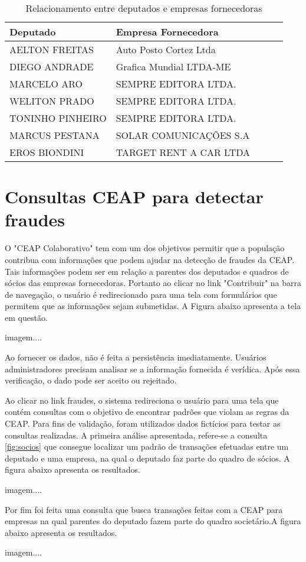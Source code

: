 \begin{table}[h!]
\centering
\begin{tabular}{|l|l|l|l|l|}
\hline
Deputado & Empresa Fornecedora \\ \hline
AELTON FREITAS & Auto Posto Cortez Ltda \\ \hline
DIEGO ANDRADE & Grafica Mundial LTDA-ME \\ \hline
MARCELO ARO & SEMPRE EDITORA LTDA. \\ \hline
WELITON PRADO & SEMPRE EDITORA LTDA. \\ \hline
TONINHO PINHEIRO & SEMPRE EDITORA LTDA. \\ \hline
MARCUS PESTANA & SOLAR COMUNICAÇÕES S.A \\ \hline
EROS BIONDINI & TARGET RENT A CAR LTDA \\ \hline
\end{tabular}
\caption{Relacionamento entre deputados e empresas fornecedoras}
\label{table:relation_deputies_companies}
\end{table}

\section{Consultas CEAP para detectar fraudes}

O "CEAP Colaborativo" tem com um dos objetivos permitir que a população contribua com informações que podem ajudar na detecção de fraudes da CEAP. Tais informações podem ser em relação a parentes dos deputados e quadros de sócios das empresas fornecedoras. Portanto ao clicar no link "Contribuir" na barra de navegação, o usuário é redirecionado para uma tela com formulários que permitem que as informações sejam submetidas. A Figura abaixo apresenta a tela em questão.

imagem....

Ao fornecer os dados, não é feita a persistência imediatamente. Usuários administradores precisam analisar se a informação fornecida é verídica. Após essa verificação, o dado pode ser aceito ou rejeitado.

Ao clicar no link fraudes, o sistema redireciona o usuário para uma tela que contém consultas com o objetivo de encontrar padrões que violam as regras da CEAP. Para fins de validação, foram utilizados dados fictícios para testar as consultas realizadas. A primeira análise apresentada, refere-se a consulta \ref{fig:socios} que consegue localizar um padrão de transações efetuadas entre um deputado e uma empresa, na qual o deputado faz parte do quadro de sócios. A figura abaixo apresenta os resultados.

imagem....

Por fim foi feita uma consulta que busca transações feitas com a CEAP para empresas na qual parentes do deputado fazem parte do quadro societário.A figura abaixo apresenta os resultados.

imagem....